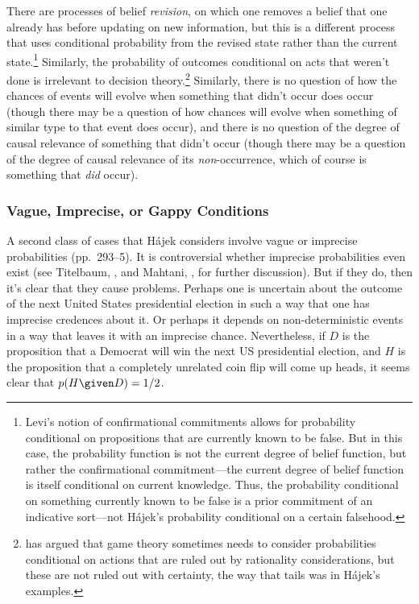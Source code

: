 There are processes of belief \emph{revision}, on which one removes a belief that one already has before updating on new information, but this is a different process that uses conditional probability from the revised state rather than the current state.\footnote{Levi's notion of confirmational commitments allows for probability conditional on propositions that are currently known to be false. But in this case, the probability function is not the current degree of belief function, but rather the confirmational commitment---the current degree of belief function is itself conditional on current knowledge. Thus, the probability conditional on something currently known to be false is a prior commitment of an indicative sort---not H\'{a}jek's probability conditional on a certain falsehood.} Similarly, the probability of outcomes conditional on acts that weren't done is irrelevant to decision theory.\footnote{\citet{brandenburger} has argued that game theory sometimes needs to consider probabilities conditional on actions that are ruled out by rationality considerations, but these are not ruled out with certainty, the way that tails was in H\'{a}jek's examples.} Similarly, there is no question of how the chances of events will evolve when something that didn't occur does occur (though there may be a question of how chances will evolve when something of similar type to that event does occur), and there is no question of the degree of causal relevance of something that didn't occur (though there may be a question of the degree of causal relevance of its \emph{non}-occurrence, which of course is something that \emph{did} occur).

\subsubsection{Vague, Imprecise, or Gappy Conditions}

A second class of cases that H\'{a}jek considers involve vague or imprecise probabilities (pp.\ 293--5). It is controversial whether imprecise probabilities even exist (see Titelbaum, , and Mahtani, , for further discussion). But if they do, then it's clear that they cause problems. Perhaps one is uncertain about the outcome of the next United States presidential election in such a way that one has imprecise credences about it. Or perhaps it depends on non-deterministic events in a way that leaves it with an imprecise chance. Nevertheless, if $D$ is the proposition that a Democrat will win the next US presidential election, and $H$ is the proposition that a completely unrelated coin flip will come up heads, it seems clear that $p(H \given D)=1/2$.

